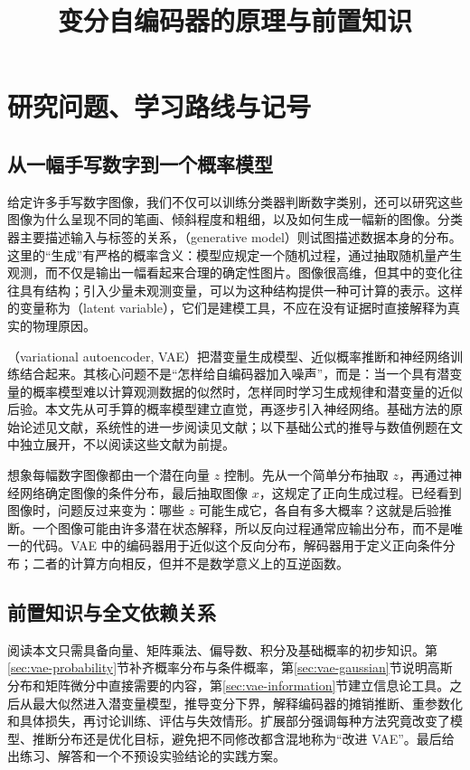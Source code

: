 \documentclass[UTF8,12pt,a4paper,fontset=fandol]{ctexart}
\title{变分自编码器的原理与前置知识}
\author{}
\date{}
\begin{document}
\maketitle
\tableofcontents

\section{研究问题、学习路线与记号}
\label{sec:vae-introduction}

\subsection{从一幅手写数字到一个概率模型}
给定许多手写数字图像，我们不仅可以训练分类器判断数字类别，还可以研究这些图像为什么呈现不同的笔画、倾斜程度和粗细，以及如何生成一幅新的图像。分类器主要描述输入与标签的关系，（generative model）则试图描述数据本身的分布。这里的“生成”有严格的概率含义：模型应规定一个随机过程，通过抽取随机量产生观测，而不仅是输出一幅看起来合理的确定性图片。图像很高维，但其中的变化往往具有结构；引入少量未观测变量，可以为这种结构提供一种可计算的表示。这样的变量称为（latent variable），它们是建模工具，不应在没有证据时直接解释为真实的物理原因。

（variational autoencoder, VAE）把潜变量生成模型、近似概率推断和神经网络训练结合起来。其核心问题不是“怎样给自编码器加入噪声”，而是：当一个具有潜变量的概率模型难以计算观测数据的似然时，怎样同时学习生成规律和潜变量的近似后验。本文先从可手算的概率模型建立直觉，再逐步引入神经网络。基础方法的原始论述见文献\cite{kingma2014}，系统性的进一步阅读见文献\cite{kingma2019}；以下基础公式的推导与数值例题在文中独立展开，不以阅读这些文献为前提。

想象每幅数字图像都由一个潜在向量 $z$ 控制。先从一个简单分布抽取 $z$，再通过神经网络确定图像的条件分布，最后抽取图像 $x$，这规定了正向生成过程。已经看到图像时，问题反过来变为：哪些 $z$ 可能生成它，各自有多大概率？这就是后验推断。一个图像可能由许多潜在状态解释，所以反向过程通常应输出分布，而不是唯一的代码。VAE 中的编码器用于近似这个反向分布，解码器用于定义正向条件分布；二者的计算方向相反，但并不是数学意义上的互逆函数。

\subsection{前置知识与全文依赖关系}
阅读本文只需具备向量、矩阵乘法、偏导数、积分及基础概率的初步知识。第\ref{sec:vae-probability}节补齐概率分布与条件概率，第\ref{sec:vae-gaussian}节说明高斯分布和矩阵微分中直接需要的内容，第\ref{sec:vae-information}节建立信息论工具。之后从最大似然进入潜变量模型，推导变分下界，解释编码器的摊销推断、重参数化和具体损失，再讨论训练、评估与失效情形。扩展部分强调每种方法究竟改变了模型、推断分布还是优化目标，避免把不同修改都含混地称为“改进 VAE”。最后给出练习、解答和一个不预设实验结论的实践方案。
\end{document}
